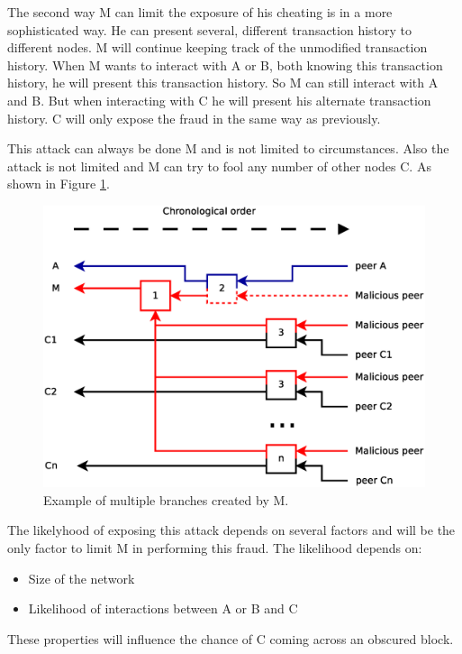 The second way M can limit the exposure of his cheating is in a more sophisticated way.
He can present several, different transaction history to different nodes.
M will continue keeping track of the unmodified transaction history.
When M wants to interact with A or B, both knowing this transaction history, he will present this transaction history.
So M can still interact with A and B.
But when interacting with C he will present his alternate transaction history.
C will only expose the fraud in the same way as previously.

This attack can always be done M and is not limited to circumstances.
Also the attack is not limited and M can try to fool any number of other nodes C.
As shown in Figure \ref{fig:branch-multiple}.

\begin{figure}
	\centerline{\includegraphics[scale=0.3]{problems/figs/branch-multiple.eps}}
	\caption{Example of multiple branches created by M.}
	\label{fig:branch-multiple}
\end{figure}

The likelyhood of exposing this attack depends on several factors
and will be the only factor to limit M in performing this fraud.
The likelihood depends on:
\begin{itemize}
\item Size of the network
\item Likelihood of interactions between A or B and C
\end{itemize}

These properties will influence the chance of C coming across an obscured block.

